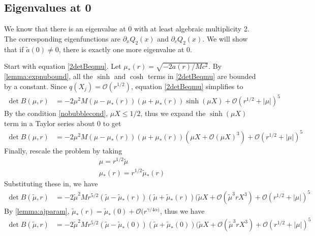 \documentclass[thesis.tex]{subfiles}
\begin{document}
\subsection{Eigenvalues at 0}

We know that there is an eigenvalue at 0 with at least algebraic multiplicity 2. The corresponding eigenfunctions are $\partial_x Q_2(x)$ and $\partial_c Q_2(x)$. We will show that if $\tilde{a}(0) \neq 0$, there is exactly one more eigenvalue at 0.

Start with equation \cref{2detBeqmu}. Let $\mu_*(r) = \sqrt{-2a(r)/M c^2}$. By \cref{lemma:expnubound}, all the $\sinh$ and $\cosh$ terms in \cref{2detBeqmu} are bounded by a constant. Since $q(X_j) = \mathcal{O}(r^{1/2})$, equation \cref{2detBeqmu} simplifies to
\begin{equation}\label{2detBeqmu3}
\begin{aligned}
\det B(\mu, r) &= -2 \mu^2 M (\mu - \mu_*(r)) (\mu + \mu_*(r)) \sinh(\mu X) + \mathcal{O}( r^{1/2} + |\mu|)^5
\end{aligned}
\end{equation}
By the condition \cref{nobubblecond}, $\mu X \leq 1/2$, thus we expand the $\sinh(\mu X)$ term in a Taylor series about 0 to get
\begin{equation}\label{2detBeqmu4}
\begin{aligned}
\det B(\mu, r) &= -2 \mu^2 M (\mu - \mu_*(r)) (\mu + \mu_*(r))( \mu X + \mathcal{O}(\mu X)^3) + \mathcal{O}( r^{1/2} + |\mu|)^5
\end{aligned}
\end{equation}
Finally, rescale the problem by taking
\begin{align*}
\mu = r^{1/2}\tilde{\mu} \\
\mu_*(r) = r^{1/2}\tilde{\mu}_*(r)
\end{align*}
Substituting these in, we have
\begin{equation}\label{2detBeqmu5}
\begin{aligned}
\det B(\tilde{\mu}, r) &= -2 \tilde{\mu}^2 M r^{5/2} (\tilde{\mu} - \tilde{\mu}_*(r)) (\tilde{\mu} + \tilde{\mu}_*(r))( \tilde{\mu} X + \mathcal{O}(\tilde{\mu}^3 r X^3) + \mathcal{O}( r^{1/2} + |\mu|)^5
\end{aligned}
\end{equation}
By \cref{lemma:ajparam}, $\tilde{\mu}_*(r) = \tilde{\mu}_*(0) + \mathcal{O}(r^{\gamma/4 \alpha)}$, thus we have
\begin{equation}\label{2detBeqmu5}
\begin{aligned}
\det B(\tilde{\mu}, r) &= -2 \tilde{\mu}^2 M r^{5/2} (\tilde{\mu} - \tilde{\mu}_*(0)) (\tilde{\mu} + \tilde{\mu}_*(0))( \tilde{\mu} X + \mathcal{O}(\tilde{\mu}^3 r X^3) + \mathcal{O}( r^{1/2} + |\mu|)^5
\end{aligned}
\end{equation}
\end{document}
